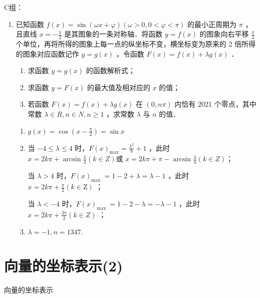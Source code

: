 C组：
\begin{enumerate}
    \item 已知函数 $f(x)=\sin (\omega x+\varphi)(\omega>0,0<\varphi<\pi)$ 的最小正周期为 $\pi$ ，且直线 $x=-\frac{\pi}{2}$ 是其图象的一条对称轴．将函数 $y=f(x)$ 的图象向右平移 $\frac{\pi}{4}$ 个单位，再将所得的图象上每一点的纵坐标不变，横坐标变为原来的 2 倍所得的图象对应函数记作 $y=g(x)$ ，令函数 $F(x)=f(x)+\lambda g(x)$ ．
    \begin{enumerate}
        \item 求函数 $y=g(x)$ 的函数解析式；
        \item 求函数 $y=F(x)$ 的最大值及相对应的 $x$ 的值；
        \item 若函数 $F(x)=f(x)+\lambda g(x)$ 在 $(0, n \pi)$ 内恰有 2021 个零点，其中常数 $\lambda \in R, n \in N, n \geq 1$ ，求常数 $\lambda$ 与 $n$ 的值．
    \end{enumerate}
\begin{jieda}
\begin{enumerate}
    \item $g(x)=\cos(x-\frac{\pi}{2})=\sin x$
    \item 当 $-4 \leq \lambda \leq 4$ 时，$F(x)_{\max}=\frac{\lambda^2}{8}+1$ ，此时 $x=2 k \pi+\arcsin \frac{\lambda}{4}(k \in Z)$或 $x=2 k \pi+\pi-\arcsin \frac{\lambda}{4}(k \in Z)$；
    
    当 $\lambda>4$ 时，$F(x)_{\text {max }}=1-2+\lambda=\lambda-1$ ，此时 $x=2 k \pi+\frac{\pi}{2}(k \in \mathrm{Z})$ ；
    
    当 $\lambda<-4$ 时，$F(x)_{\text {max }}=1-2-\lambda=-\lambda-1$ ，此时 $x=2 k \pi+\frac{3 \pi}{2}(k \in Z)$ ；

    \item $\lambda=-1, n=1347$.
\end{enumerate}
\end{jieda}

\end{enumerate}

\section*{向量的坐标表示(2)}
\zsd 向量的坐标表示


